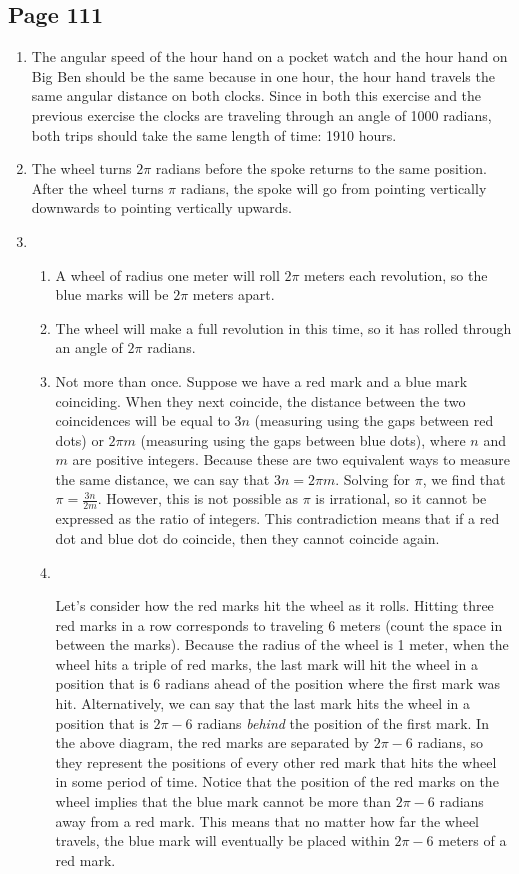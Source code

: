\documentclass{article}
\newenvironment{solutions}[1]
{\subsection*{#1}
 \begin{enumerate}[leftmargin=1.5em]}
{\end{enumerate}}
\newcommand{\solution}{\item}
\newenvironment{subsolutions}
{\begin{enumerate}}
{\end{enumerate}}
\newcommand{\subsolution}{\item}
\begin{document}
\begin{solutions}{Page 111}
\solution %
The angular speed of the hour hand on a pocket watch and the hour hand on Big Ben should be the same because in one hour, the hour hand travels the same angular distance on both clocks. Since in both this exercise and the previous exercise the clocks are traveling through an angle of 1000 radians, both trips should take the same length of time: 1910 hours.

\solution %
The wheel turns $2\pi$ radians before the spoke returns to the same position. After the wheel turns $\pi$ radians, the spoke will go from pointing vertically downwards to pointing vertically upwards. 

\solution %
\begin{subsolutions}
\subsolution %
A wheel of radius one meter will roll $2\pi$ meters each revolution, so the blue marks will be $2\pi$ meters apart.
\subsolution %
The wheel will make a full revolution in this time, so it has rolled through an angle of $2\pi$ radians.
\subsolution %
Not more than once. Suppose we have a red mark and a blue mark coinciding. When they next coincide, the distance between the two coincidences will be equal to $3n$ (measuring using the gaps between red dots) or $2\pi m$ (measuring using the gaps between blue dots), where $n$ and $m$ are positive integers. Because these are two equivalent ways to measure the same distance, we can say that $3n = 2\pi m$. Solving for $\pi$, we find that $\pi = \tfrac{3n}{2m}$. However, this is not possible as $\pi$ is irrational, so it cannot be expressed as the ratio of integers. This contradiction means that if a red dot and blue dot do coincide, then they cannot coincide again.

\subsolution ~%
\begin{center}
\end{center}

Let's consider how the red marks hit the wheel as it rolls. Hitting three red marks in a row corresponds to traveling 6 meters (count the space in between the marks). Because the radius of the wheel is 1 meter, when the wheel hits a triple of red marks, the last mark will hit the wheel in a position that is 6 radians ahead of the position where the first mark was hit. Alternatively, we can say that the last mark hits the wheel in a position that is $2\pi - 6$ radians \textit{behind} the position of the first mark. In the above diagram, the red marks are separated by $2\pi-6$ radians, so they represent the positions of every other red mark that hits the wheel in some period of time. Notice that the position of the red marks on the wheel implies that the blue mark cannot be more than $2\pi-6$ radians away from a red mark. This means that no matter how far the wheel travels, the blue mark will eventually be placed within $2\pi-6$ meters of a red mark.


\end{subsolutions}
\end{solutions}
\end{document}
